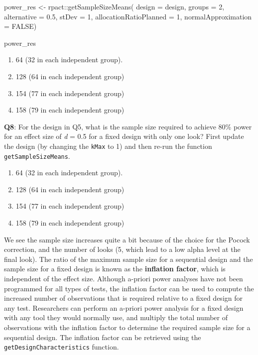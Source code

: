 \documentclass[
  oneside]{krantz}
\makeatletter
\newenvironment{Shaded}{\begin{snugshade}}{\end{snugshade}}
\newcommand{\AttributeTok}[1]{\textcolor[rgb]{0.61,0.61,0.61}{#1}}
\newcommand{\ConstantTok}[1]{\textcolor[rgb]{0,0,0}{#1}}
\newcommand{\DecValTok}[1]{\textcolor[rgb]{0.06,0.06,0.06}{#1}}
\newcommand{\FloatTok}[1]{\textcolor[rgb]{0.06,0.06,0.06}{#1}}
\newcommand{\FunctionTok}[1]{\textcolor[rgb]{0,0,0}{#1}}
\newcommand{\NormalTok}[1]{#1}
\newcommand{\OtherTok}[1]{\textcolor[rgb]{0.37,0.37,0.37}{#1}}
\newcommand{\SpecialCharTok}[1]{\textcolor[rgb]{0,0,0}{#1}}
\providecommand{\tightlist}{%
  \setlength{\itemsep}{0pt}\setlength{\parskip}{0pt}}
\newenvironment{kframe}{%
\medskip{}
\setlength{\fboxsep}{.8em}
 \def\at@end@of@kframe{}%
 \ifinner\ifhmode%
  \def\at@end@of@kframe{\end{minipage}}%
  \begin{minipage}{\columnwidth}%
 \fi\fi%
 \def\FrameCommand##1{\hskip\@totalleftmargin \hskip-\fboxsep
 \colorbox{shadecolor}{##1}\hskip-\fboxsep
     \hskip-\linewidth \hskip-\@totalleftmargin \hskip\columnwidth}%
 \MakeFramed {\advance\hsize-\width
   \@totalleftmargin\z@ \linewidth\hsize
   \@setminipage}}%
 {\par\unskip\endMakeFramed%
 \at@end@of@kframe}
\renewenvironment{Shaded}{\begin{kframe}}{\end{kframe}}
\makeatother
\begin{document}
\begin{Shaded}
\begin{Highlighting}[]
\NormalTok{power\_res }\OtherTok{\textless{}{-}}\NormalTok{ rpact}\SpecialCharTok{::}\FunctionTok{getSampleSizeMeans}\NormalTok{(}
  \AttributeTok{design =}\NormalTok{ design,}
  \AttributeTok{groups =} \DecValTok{2}\NormalTok{,}
  \AttributeTok{alternative =} \FloatTok{0.5}\NormalTok{, }
  \AttributeTok{stDev =} \DecValTok{1}\NormalTok{, }
  \AttributeTok{allocationRatioPlanned =} \DecValTok{1}\NormalTok{,}
  \AttributeTok{normalApproximation =} \ConstantTok{FALSE}\NormalTok{)}

\NormalTok{power\_res}
\end{Highlighting}
\end{Shaded}

\begin{enumerate}
\def\labelenumi{\Alph{enumi})}
\tightlist
\item
  64 (32 in each independent group).
\item
  128 (64 in each independent group)
\item
  154 (77 in each independent group)
\item
  158 (79 in each independent group)
\end{enumerate}

\textbf{Q8}: For the design in Q5, what is the sample size required to achieve 80\% power for an effect size of \emph{d} = 0.5 for a fixed design with only one look? First update the design (by changing the \texttt{kMax} to 1) and then re-run the function \texttt{getSampleSizeMeans}.

\begin{enumerate}
\def\labelenumi{\Alph{enumi})}
\tightlist
\item
  64 (32 in each independent group).
\item
  128 (64 in each independent group)
\item
  154 (77 in each independent group)
\item
  158 (79 in each independent group)
\end{enumerate}

We see the sample size increases quite a bit because of the choice for the Pocock correction, and the number of looks (5, which lead to a low alpha level at the final look). The ratio of the maximum sample size for a sequential design and the sample size for a fixed design is known as the \textbf{inflation factor}, which is independent of the effect size. Although a-priori power analyses have not been programmed for all types of tests, the inflation factor can be used to compute the increased number of observations that is required relative to a fixed design for any test. Researchers can perform an a-priori power analysis for a fixed design with any tool they would normally use, and multiply the total number of observations with the inflation factor to determine the required sample size for a sequential design. The inflation factor can be retrieved using the \texttt{getDesignCharacteristics} function.
\end{document}
